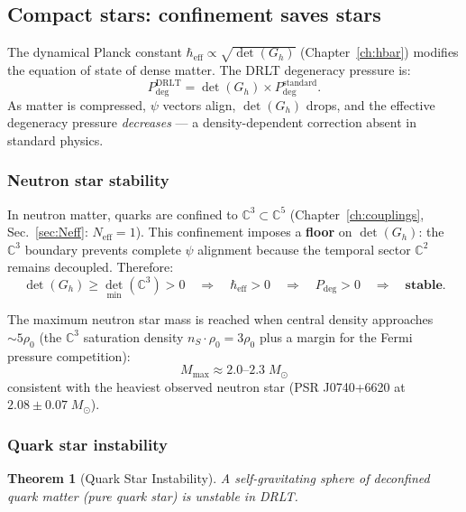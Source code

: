 \documentclass[12pt]{article}
\newtheorem{theorem}{Theorem}[section]
\theoremstyle{remark}
\theoremstyle{definition}
\begin{document}
\subsection{Compact stars: confinement saves stars}

The dynamical Planck constant $\hbar_\text{eff} \propto \sqrt{\det(G_h)}$ (Chapter~\ref{ch:hbar}) modifies the equation of state of dense matter. The DRLT degeneracy pressure is:
\begin{equation}
P_\text{deg}^\text{DRLT} = \det(G_h) \times P_\text{deg}^\text{standard}.
\end{equation}
As matter is compressed, $\psi$ vectors align, $\det(G_h)$ drops, and the effective degeneracy pressure \emph{decreases} --- a density-dependent correction absent in standard physics.

\subsubsection{Neutron star stability}

In neutron matter, quarks are confined to $\mathbb{C}^3 \subset \mathbb{C}^5$ (Chapter~\ref{ch:couplings}, Sec.~\ref{sec:Neff}: $N_\text{eff} = 1$). This confinement imposes a \textbf{floor} on $\det(G_h)$: the $\mathbb{C}^3$ boundary prevents complete $\psi$ alignment because the temporal sector $\mathbb{C}^2$ remains decoupled. Therefore:
\begin{equation}
\det(G_h) \geq \det_\text{min}(\mathbb{C}^3) > 0 \quad\Rightarrow\quad \hbar_\text{eff} > 0 \quad\Rightarrow\quad P_\text{deg} > 0 \quad\Rightarrow\quad \textbf{stable.}
\end{equation}

The maximum neutron star mass is reached when central density approaches $\sim 5\rho_0$ (the $\mathbb{C}^3$ saturation density $n_S \cdot \rho_0 = 3\rho_0$ plus a margin for the Fermi pressure competition):
\begin{equation}
M_\text{max} \approx 2.0\text{--}2.3\;M_\odot
\end{equation}
consistent with the heaviest observed neutron star (PSR J0740+6620 at $2.08 \pm 0.07\;M_\odot$).

\subsubsection{Quark star instability}

\begin{theorem}[Quark Star Instability]
A self-gravitating sphere of deconfined quark matter (pure quark star) is unstable in DRLT.
\end{theorem}
\end{document}

